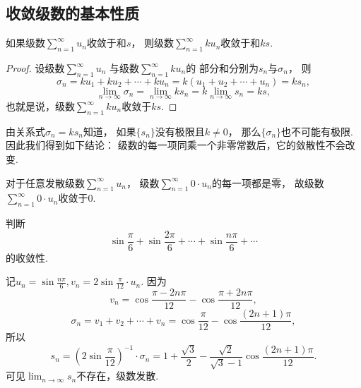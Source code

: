 \subsection{收敛级数的基本性质}
\begin{property}\label{theorem:无穷级数.收敛级数性质1}
如果级数\(\sum_{n=1}^\infty u_n\)收敛于和\(s\)，
则级数\(\sum_{n=1}^\infty k u_n\)收敛于和\(ks\).
\begin{proof}
设级数\(\sum_{n=1}^\infty u_n\)
与级数\(\sum_{n=1}^\infty k u_n\)的
部分和分别为\(s_n\)与\(\sigma_n\)，
则\begin{equation*}
	\sigma_n
	= k u_1 + k u_2 + \dotsb + k u_n
	= k(u_1 + u_2 + \dotsb + u_n) = k s_n,
\end{equation*}\begin{equation*}
	\lim_{n\to\infty} \sigma_n
	= \lim_{n\to\infty} k s_n
	= k \lim_{n\to\infty} s_n = ks,
\end{equation*}
也就是说，级数\(\sum_{n=1}^\infty k u_n\)收敛于\(ks\).
\end{proof}
\end{property}
\begin{remark}
由关系式\(\sigma_n = k s_n\)知道，
如果\(\{s_n\}\)没有极限且\(k\neq0\)，
那么\(\{\sigma_n\}\)也不可能有极限.
因此我们得到如下结论：
{\color{red}级数的每一项同乘一个非零常数后，它的敛散性不会改变.}
\end{remark}
\begin{remark}
对于任意发散级数\(\sum_{n=1}^\infty u_n\)，
级数\(\sum_{n=1}^\infty 0 \cdot u_n\)的每一项都是零，
故级数\(\sum_{n=1}^\infty 0 \cdot u_n\)收敛于\(0\).
\end{remark}

\begin{example}
判断\begin{equation*}
\sin\frac{\pi}{6}+\sin\frac{2\pi}{6}+\dotsb+\sin\frac{n\pi}{6}+\dotsb
\end{equation*}的收敛性.
\begin{solution}
记\(u_n = \sin\frac{n\pi}{6},
v_n = 2\sin\frac{\pi}{12} \cdot u_n\).
因为\begin{equation*}
	v_n = \cos\frac{\pi-2n\pi}{12} - \cos\frac{\pi+2n\pi}{12},
\end{equation*}\begin{equation*}
	\sigma_n
	= v_1 + v_2 + \dotsb + v_n
	= \cos\frac{\pi}{12} - \cos\frac{(2n+1)\pi}{12},
\end{equation*}
所以\begin{equation*}
	s_n
	= \left(2\sin\frac{\pi}{12}\right)^{-1} \cdot \sigma_n
	= 1+\frac{\sqrt{3}}{2} - \frac{\sqrt{2}}{\sqrt{3}-1} \cos\frac{(2n+1)\pi}{12}.
\end{equation*}
可见\(\lim_{n\to\infty} s_n\)不存在，级数发散.
\end{solution}
\end{example}

